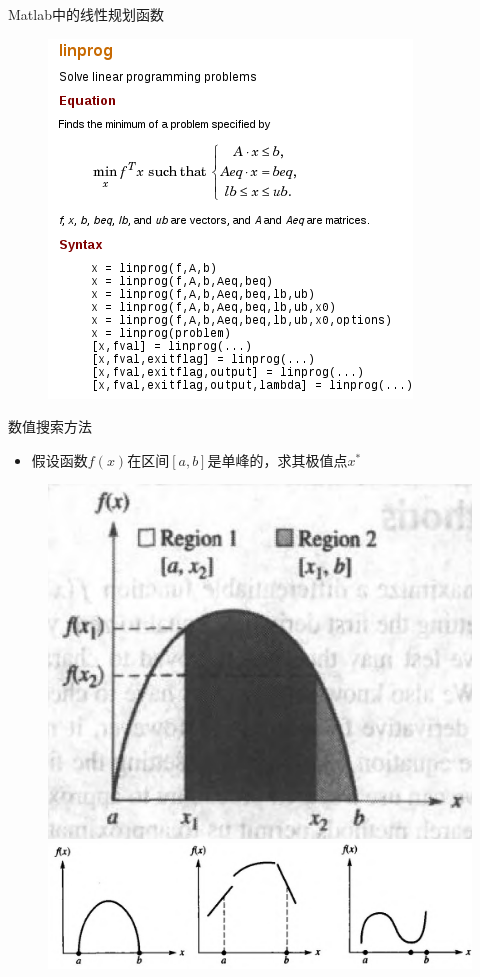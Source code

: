\documentclass[UTF8]{ctexbeamer}
\begin{document}
\begin{frame}{Matlab中的线性规划函数}
  \begin{figure}
    \includegraphics[height=\textheight{}]{linprog.png}
  \end{figure}  

\end{frame}

\begin{frame}{数值搜索方法}
  \begin{itemize}
  \item 假设函数$f(x)$在区间$[a,b]$是单峰的，求其极值点$x^*$
  \end{itemize}

  \begin{figure}
    \includegraphics[width=.4\textwidth{}]{part.png}

    \includegraphics[width=.8\textwidth{}]{unimodal.png}
  \end{figure}  
  
\end{frame}
\end{document}

